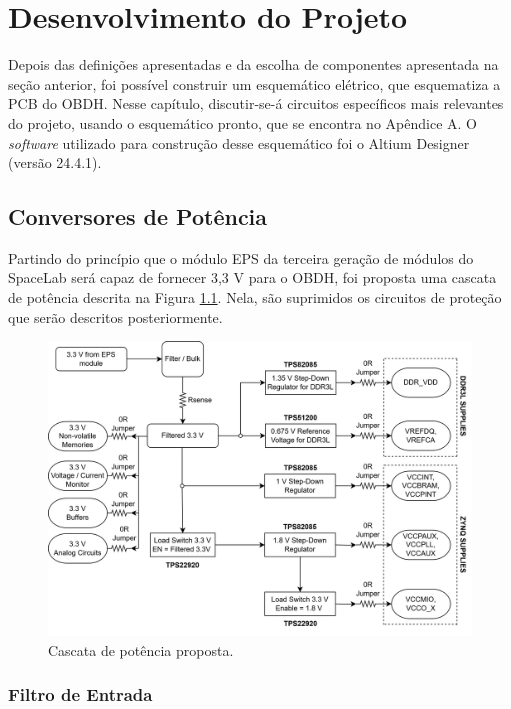 \chapter{Desenvolvimento do Projeto}

Depois das definições apresentadas e da escolha de componentes apresentada na seção anterior, foi possível construir um esquemático elétrico, que esquematiza a PCB do OBDH. Nesse capítulo, discutir-se-á circuitos específicos mais relevantes do projeto, usando o esquemático pronto, que se encontra no Apêndice A. O \textit{software} utilizado para construção desse esquemático foi o Altium Designer (versão 24.4.1).

\section{Conversores de Potência}

Partindo do princípio que o módulo EPS da terceira geração de módulos do SpaceLab será capaz de fornecer 3,3 V para o OBDH, foi proposta uma cascata de potência descrita na Figura \ref{fig:power}. Nela, são suprimidos os circuitos de proteção que serão descritos posteriormente.

\begin{figure}[H]
    \centering
    \includegraphics[scale=0.8]{images/Power_system.png}
    \caption{Cascata de potência proposta.}
    \label{fig:power}
\end{figure}

\subsection{Filtro de Entrada}

